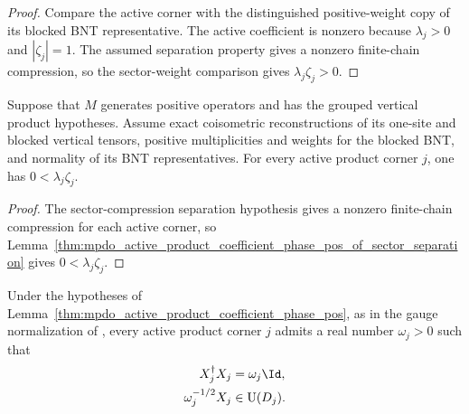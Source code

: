 \begin{proof}\leanok
    Compare the active corner with the distinguished positive-weight copy of
    its blocked BNT representative. The active coefficient is nonzero because
    $\lambda_j>0$ and $|\zeta_j|=1$. The assumed separation property gives
    a nonzero finite-chain compression, so the sector-weight comparison gives
    $\lambda_j\zeta_j>0$.
\end{proof}

\begin{lemma}
    \label{thm:mpdo_active_product_coefficient_phase_pos}
    \leanok
    Suppose that $M$ generates positive operators and has the grouped vertical
    product hypotheses. Assume
    exact coisometric reconstructions of its one-site and
    blocked vertical tensors, positive multiplicities and weights for the
    blocked BNT, and normality of its BNT representatives. For every active
    product corner $j$, one has $0<\lambda_j\zeta_j$.
\end{lemma}

\begin{proof}\leanok
    The sector-compression separation hypothesis gives a nonzero
    finite-chain compression for each active corner, so
    Lemma~\ref{thm:mpdo_active_product_coefficient_phase_pos_of_sector_separation}
    gives $0<\lambda_j\zeta_j$.
\end{proof}

\begin{lemma}
    \label{thm:mpdo_active_product_gauge_unitary_normalization}
    \leanok
    Under the hypotheses of
    Lemma~\ref{thm:mpdo_active_product_coefficient_phase_pos}, as in the
    gauge normalization of
    \cite[Appendix~C.4, lines~2025--2029]{Cirac2016MPDO_arXiv},
    every active product corner $j$ admits a real number $\omega_j>0$ such that
    \begin{align}
        X_j^\dagger X_j
         & =\omega_j\Id,
        \notag                 \\
        \omega_j^{-1/2}X_j
         & \in\mathrm{U}(D_j).
        \notag
    \end{align}
\end{lemma}

